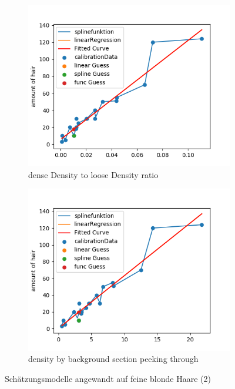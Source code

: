 \documentclass[german,a4paper, 12pt]{llncs}
\begin{document}
\begin{figure}[H]
	\medskip
	\begin{subfigure}{0.48\textwidth}
		\includegraphics[width=1.1\linewidth]{figBina/g11.png}
		\caption{dense Density to loose Density ratio} \label{fig:e}
	\end{subfigure}\hspace*{\fill}
	\begin{subfigure}{0.48\textwidth}
		\includegraphics[width=1.1\linewidth]{figBina/g12.png}
		\caption{density by background section peeking through} \label{fig:f}
	\end{subfigure}
	
	
	\caption{Schätzungsmodelle angewandt auf feine blonde Haare (2)} \label{fig:1}
\end{figure}
\end{document}

